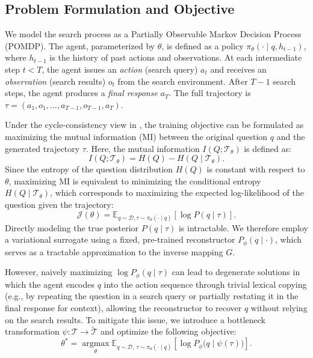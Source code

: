 \subsection{Problem Formulation and Objective}
\label{sec:problem_formulation}
We model the search process as a Partially Observable Markov Decision Process (POMDP). The agent, parameterized by $\theta$, is defined as a policy $\pi_\theta(\cdot \mid q, h_{t-1})$, where $h_{t-1}$ is the history of past actions and observations. At each intermediate step $t<T$, the agent issues an \emph{action} (search query) $a_t$ and receives an \emph{observation} (search results) $o_t$ from the search environment. After $T-1$ search steps, the agent produces a \emph{final response} $a_T$. The full trajectory is $\tau = (a_1, o_1, \ldots, a_{T-1}, o_{T-1}, a_T)$.

Under the cycle-consistency view in , the training objective can be formulated as maximizing the mutual information (MI) between the original question $q$ and the generated trajectory $\tau$.
Here, the mutual information $I(Q; \mathcal{T}_\theta)$ is defined as:
\begin{equation}
    I(Q; \mathcal{T}_\theta) = H(Q) - H(Q \mid \mathcal{T}_\theta).
\end{equation}
Since the entropy of the question distribution $H(Q)$ is constant with respect to $\theta$, maximizing MI is equivalent to minimizing the conditional entropy $H(Q \mid \mathcal{T}_\theta)$, which corresponds to maximizing the expected log-likelihood of the question given the trajectory:
\begin{equation}
    \mathcal{J}(\theta) = \mathbb{E}_{q \sim \mathcal{D}, \tau \sim \pi_\theta(\cdot\mid q)} \left[ \log P(q \mid \tau) \right].
\end{equation}
Directly modeling the true posterior $P(q \mid \tau)$ is intractable. We therefore employ a variational surrogate using a fixed, pre-trained reconstructor $P_\phi(q \mid \cdot)$, which serves as a tractable approximation to the inverse mapping $G$.

However, naively maximizing $\log P_\phi(q\mid\tau)$ can lead to degenerate solutions in which the agent encodes $q$ into the action sequence through trivial lexical copying (e.g., by repeating the question in a search query or partially restating it in the final response for context), allowing the reconstructor to recover $q$ without relying on the search results. To mitigate this issue, we introduce a bottleneck transformation $\psi: \mathcal{T} \rightarrow \tilde{\mathcal{T}}$ and optimize the following objective:
\begin{equation}
    \theta^* = \operatorname*{argmax}_\theta
    \mathbb{E}_{q \sim \mathcal{D},\, \tau \sim \pi_\theta(\cdot\mid q)}
    \left[ \log P_\phi\big(q \mid \psi(\tau)\big) \right].
\end{equation}

